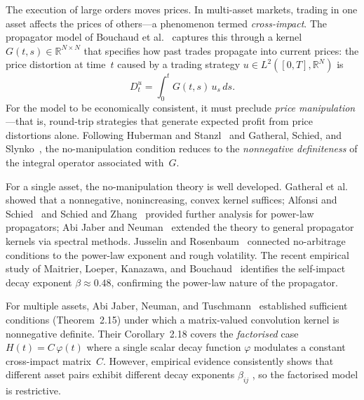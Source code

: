 \documentclass[12pt]{article}
\theoremstyle{definition}
\theoremstyle{remark}
\newcommand{\R}{\mathbb{R}}
\begin{document}
The execution of large orders moves prices.  In multi-asset markets, trading in one asset
affects the prices of others---a phenomenon termed \emph{cross-impact}.  The propagator model
of Bouchaud et al.~\cite{Bouchaud2004,BouchaudBook2018} captures this through a kernel
$G(t,s)\in\R^{N\times N}$ that specifies how past trades propagate into current prices:
the price distortion at time~$t$ caused by a trading strategy $u\in L^2([0,T],\R^N)$ is
\begin{equation}\label{eq:distortion}
  D_t^u = \int_0^t G(t,s)\,u_s\,ds.
\end{equation}
For the model to be economically consistent, it must preclude \emph{price manipulation}---that
is, round-trip strategies that generate expected profit from price distortions alone.
Following Huberman and Stanzl~\cite{HubermanStanzl2004} and Gatheral, Schied, and
Slynko~\cite{GatheralSchiedSlynko2012}, the no-manipulation condition reduces to the
\emph{nonnegative definiteness} of the integral operator associated with~$G$.

For a single asset, the no-manipulation theory is well developed.  Gatheral et
al.~\cite{GatheralSchiedSlynko2012} showed that a nonnegative, nonincreasing, convex
kernel suffices; Alfonsi and Schied~\cite{AlfonsiSchied2013} and
Schied and Zhang~\cite{SchiedZhang2021} provided further analysis
for power-law propagators;
Abi Jaber and Neuman~\cite{AbiJaberNeuman2025} extended the theory to general
propagator kernels via spectral methods.
Jusselin and Rosenbaum~\cite{JusselinRosenbaum2020} connected no-arbitrage
conditions to the power-law exponent and rough volatility.
The recent empirical study of Maitrier, Loeper,
Kanazawa, and Bouchaud~\cite{MLKB2026} identifies the self-impact decay exponent
$\beta\approx 0.48$, confirming the power-law nature of the propagator.

For multiple assets, Abi Jaber, Neuman, and Tuschmann~\cite{AbiJaberNeumanTuschmann2026}
established sufficient conditions (Theorem~2.15) under which a matrix-valued convolution
kernel is nonnegative definite.  Their Corollary~2.18 covers the \emph{factorised} case
$H(t) = C\,\varphi(t)$ where a single scalar decay function $\varphi$ modulates a
constant cross-impact matrix~$C$.  However, empirical evidence consistently shows that
different asset pairs exhibit different decay exponents $\beta_{ij}$
\cite{BouchaudBook2018,RosenbaumTomas2021,HeyNeumanTuschmann2025}, so the factorised
model is restrictive.
\end{document}
